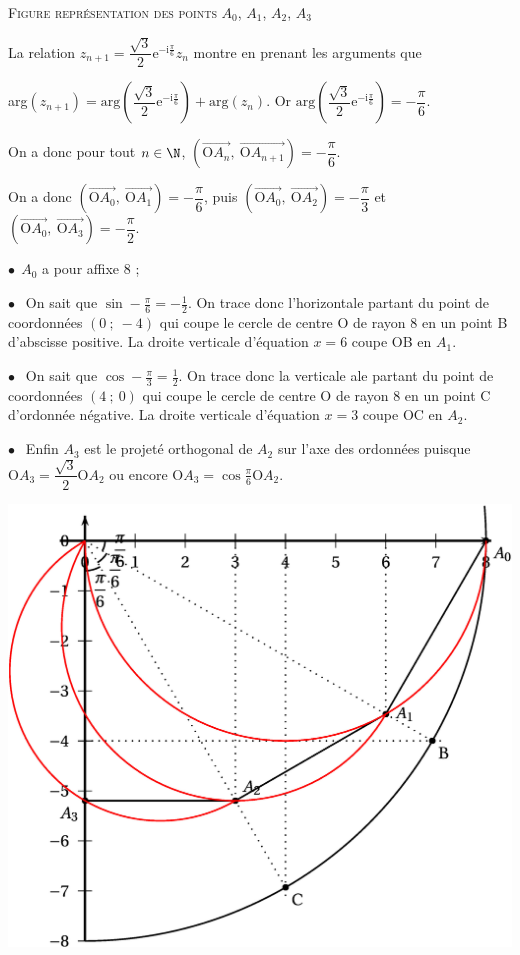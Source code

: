 \documentclass{cornouaille}
\begin{document}
\textsc{Figure représentation des points $A_0$, \:$A_1$, \:$A_2$, \:$A_3$}

La relation $z_{n+1} = \dfrac{\sqrt{3}}{2}\text{e}^{- \text{i}\frac{\pi}{6}}z_n$ montre en prenant les arguments que

arg$\left(z_{n+1} \right) = \text{arg}\left(\dfrac{\sqrt{3}}{2}\text{e}^{- \text{i}\frac{\pi}{6}}\right) + \text{arg}\left(z_n\right)$.
Or $\text{arg}\left(\dfrac{\sqrt{3}}{2}\text{e}^{- \text{i}\frac{\pi}{6}} \right) = - \dfrac{\pi}{6}$.

On a donc pour tout $n \in \N$, $\left(\overrightarrow{\text{O}A_n},~\overrightarrow{\text{O}A_{n+1}} \right) = - \dfrac{\pi}{6}$.

On a donc $\left(\overrightarrow{\text{O}A_0},~\overrightarrow{\text{O}A_{1}} \right) = - \dfrac{\pi}{6}$, puis
$\left(\overrightarrow{\text{O}A_0},~\overrightarrow{\text{O}A_{2}} \right) = - \dfrac{\pi}{3}$ et $\left(\overrightarrow{\text{O}A_0},~\overrightarrow{\text{O}A_{3}} \right) = - \dfrac{\pi}{2}$.

\smallskip

$\bullet~~$$A_0$ a pour affixe 8 ;

$\bullet~~$ On sait que $\sin - \frac{\pi}{6} = - \frac{1}{2}$. On trace donc l'horizontale partant du point de coordonnées $(0~;~- 4)$ qui coupe le cercle de centre O de rayon 8 en un point B d'abscisse positive. La droite verticale d'équation $x = 6$ coupe OB en $A_1$.

$\bullet~~$ On sait que $\cos - \frac{\pi}{3} =  \frac{1}{2}$. On trace donc la verticale ale partant du point de coordonnées $(4~;~0)$ qui coupe le cercle de centre O de rayon 8 en un point C d'ordonnée négative. La droite verticale  d'équation $x = 3$ coupe OC en $A_2$.

$\bullet~~$ Enfin $A_3$ est le projeté orthogonal de $A_2$ sur l'axe des ordonnées puisque $\text{O}A_3 = \dfrac{\sqrt{3}}{2}\text{O}A_2$ ou encore $\text{O}A_3 = \cos \frac{\pi}{6}\text{O}A_2$.



\includegraphics{./TS-Complexes-Loga-3}
\end{document}
